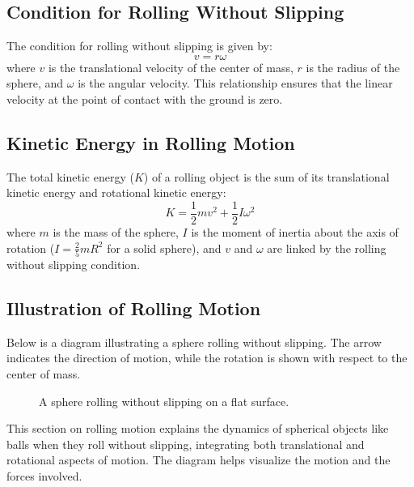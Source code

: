 \documentclass[12pt]{article}
\begin{document}
\subsection{Condition for Rolling Without Slipping}
The condition for rolling without slipping is given by:
\[
v = r\omega
\]
where \(v\) is the translational velocity of the center of mass, \(r\) is the radius of the sphere, and \(\omega\) is the angular velocity. This relationship ensures that the linear velocity at the point of contact with the ground is zero.

\subsection{Kinetic Energy in Rolling Motion}
The total kinetic energy (\(K\)) of a rolling object is the sum of its translational kinetic energy and rotational kinetic energy:
\[
K = \frac{1}{2} mv^2 + \frac{1}{2} I\omega^2
\]
where \(m\) is the mass of the sphere, \(I\) is the moment of inertia about the axis of rotation (\(I = \frac{2}{5}mR^2\) for a solid sphere), and \(v\) and \(\omega\) are linked by the rolling without slipping condition.

\subsection{Illustration of Rolling Motion}
Below is a diagram illustrating a sphere rolling without slipping. The arrow indicates the direction of motion, while the rotation is shown with respect to the center of mass.

\begin{figure}[h]
\centering
{}
\caption{A sphere rolling without slipping on a flat surface.}
\end{figure}

This section on rolling motion explains the dynamics of spherical objects like balls when they roll without slipping, integrating both translational and rotational aspects of motion. The diagram helps visualize the motion and the forces involved.
\end{document}
